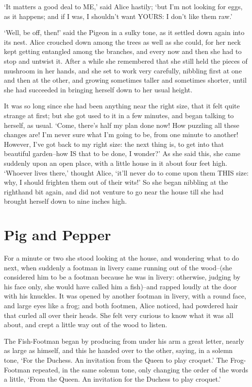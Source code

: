 \documentclass[12pt]{book}
\begin{document}
  `It matters a good deal to ME,' said Alice hastily; `but I'm
not looking for eggs, as it happens; and if I was, I shouldn't
want YOURS:  I don't like them raw.'

  `Well, be off, then!' said the Pigeon in a sulky tone, as it
settled down again into its nest.  Alice crouched down among the
trees as well as she could, for her neck kept getting entangled
among the branches, and every now and then she had to stop and
untwist it.  After a while she remembered that she still held the
pieces of mushroom in her hands, and she set to work very
carefully, nibbling first at one and then at the other, and
growing sometimes taller and sometimes shorter, until she had
succeeded in bringing herself down to her usual height.

  It was so long since she had been anything near the right size,
that it felt quite strange at first; but she got used to it in a
few minutes, and began talking to herself, as usual.  `Come,
there's half my plan done now!  How puzzling all these changes
are!  I'm never sure what I'm going to be, from one minute to
another!  However, I've got back to my right size:  the next
thing is, to get into that beautiful garden--how IS that to be
done, I wonder?'  As she said this, she came suddenly upon an
open place, with a little house in it about four feet high.
`Whoever lives there,' thought Alice, `it'll never do to come
upon them THIS size:  why, I should frighten them out of their
wits!'  So she began nibbling at the righthand bit again, and did
not venture to go near the house till she had brought herself
down to nine inches high.

\chapter{Pig and Pepper}

  For a minute or two she stood looking at the house, and
wondering what to do next, when suddenly a footman in livery came
running out of the wood--(she considered him to be a footman
because he was in livery:  otherwise, judging by his face only,
she would have called him a fish)--and rapped loudly at the door
with his knuckles.  It was opened by another footman in livery,
with a round face, and large eyes like a frog; and both footmen,
Alice noticed, had powdered hair that curled all over their
heads.  She felt very curious to know what it was all about, and
crept a little way out of the wood to listen.

  The Fish-Footman began by producing from under his arm a great
letter, nearly as large as himself, and this he handed over to
the other, saying, in a solemn tone, `For the Duchess.  An
invitation from the Queen to play croquet.'  The Frog-Footman
repeated, in the same solemn tone, only changing the order of the
words a little, `From the Queen.  An invitation for the Duchess
to play croquet.'
\end{document}
